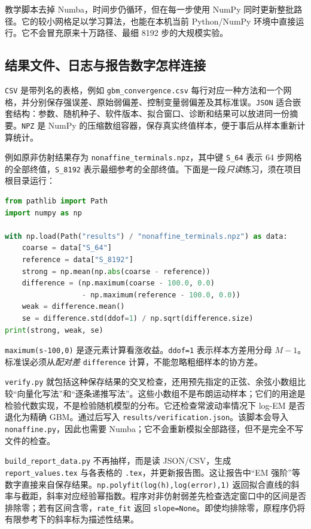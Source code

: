 \documentclass[11pt,a4paper,fontset=none]{ctexart}
\numberwithin{equation}{section}
\begin{document}
教学脚本去掉 Numba，时间步仍循环，但在每一步使用 NumPy 同时更新整批路径。它的较小网格足以学习算法，也能在本机当前 Python/NumPy 环境中直接运行。它不会冒充原来十万路径、最细 8192 步的大规模实验。

\subsection{结果文件、日志与报告数字怎样连接}

\texttt{CSV} 是带列名的表格，例如 \texttt{gbm\_convergence.csv} 每行对应一种方法和一个网格，并分别保存强误差、原始弱偏差、控制变量弱偏差及其标准误。\texttt{JSON} 适合嵌套结构：参数、随机种子、软件版本、拟合窗口、诊断和结果可以放进同一份摘要。\texttt{NPZ} 是 NumPy 的压缩数组容器，保存真实终值样本，便于事后从样本重新计算统计。

例如原非仿射结果存为 \texttt{nonaffine\_terminals.npz}，其中键 \texttt{S\_64} 表示 64 步网格的全部终值，\texttt{S\_8192} 表示最细参考的全部终值。下面是一段\emph{只读}练习，须在项目根目录运行：
\begin{lstlisting}[language=Python]
from pathlib import Path
import numpy as np

with np.load(Path("results") / "nonaffine_terminals.npz") as data:
    coarse = data["S_64"]
    reference = data["S_8192"]
    strong = np.mean(np.abs(coarse - reference))
    difference = (np.maximum(coarse - 100.0, 0.0)
                  - np.maximum(reference - 100.0, 0.0))
    weak = difference.mean()
    se = difference.std(ddof=1) / np.sqrt(difference.size)
print(strong, weak, se)
\end{lstlisting}
\texttt{maximum(s-100,0)} 是逐元素计算看涨收益。\texttt{ddof=1} 表示样本方差用分母 $M-1$。标准误必须从\emph{配对差} \texttt{difference} 计算，不能忽略粗细样本的协方差。

\texttt{verify.py} 就包括这种保存结果的交叉检查，还用预先指定的正弦、余弦小数组比较“向量化写法”和“逐条递推写法”。这些小数组不是布朗运动样本；它们的用途是检验代数实现，不是检验随机模型的分布。它还检查常波动率情况下 log-EM 是否退化为精确 GBM。通过后写入 \texttt{results/verification.json}。该脚本会导入 \texttt{nonaffine.py}，因此也需要 Numba；它不会重新模拟全部路径，但不是完全不写文件的检查。

\texttt{build\_report\_data.py} 不再抽样，而是读 JSON/CSV，生成 \texttt{report\_values.tex} 与各表格的 \texttt{.tex}，并更新报告图。这让报告中“EM 强阶”等数字直接来自保存结果。\texttt{np.polyfit(log(h),log(error),1)} 返回拟合直线的斜率与截距，斜率对应经验幂指数。程序对非仿射弱差先检查选定窗口中的区间是否排除零；若有区间含零，\texttt{rate\_fit} 返回 \texttt{slope=None}。即使均排除零，原程序仍将有限参考下的斜率标为描述性结果。
\end{document}
